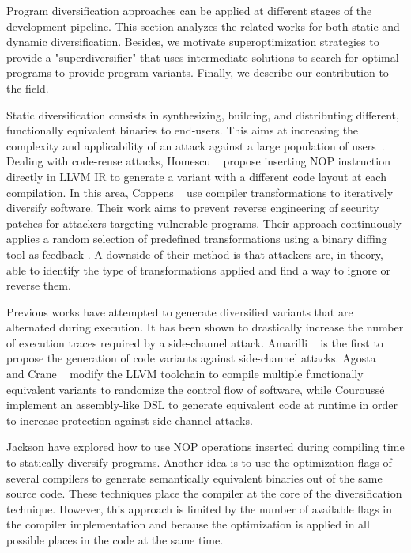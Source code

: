 Program diversification approaches can be applied at different stages of the development pipeline. This section analyzes the related works for both static and dynamic diversification. Besides, we motivate superoptimization strategies to provide a "superdiversifier" that uses intermediate solutions to search for optimal programs to provide program variants. Finally, we describe our contribution to the field.


Static diversification consists in synthesizing, building, and distributing different, functionally equivalent binaries to end-users. This aims at increasing the complexity and applicability of an attack against a large population of users~\cite{cohen1993operating}. 
Dealing with code-reuse attacks, Homescu \etal~\cite{homescu2013profile} propose inserting NOP instruction directly in LLVM IR to generate a variant with a different code layout at each compilation. 
In this area, Coppens \etal~\cite{coppens2013feedback} use compiler transformations to iteratively diversify software.
Their work aims to prevent reverse engineering of security patches for attackers targeting vulnerable programs.
Their approach continuously applies a random selection of predefined transformations using a binary diffing tool as feedback \citationneeded.
A downside of their method is that attackers are, in theory, able to identify the type of transformations applied and find a way to ignore or reverse them.

Previous works have attempted to generate diversified variants that are alternated during execution.
It has been shown to drastically increase the number of execution traces required by a side-channel attack.
Amarilli \etal~\cite{amarilli2011can} is the first to propose the generation of code variants against side-channel attacks.
Agosta \etal~\cite{agosta2015meet} and Crane \etal~\cite{crane2015thwarting}
modify the LLVM toolchain to compile multiple functionally equivalent variants to randomize the control flow of software,
while Courouss{\'e} \etal~\cite{courousse2016runtime} implement an assembly-like DSL to generate equivalent code at runtime in order to increase protection against side-channel attacks. 


Jackson \etal \cite{jackson} have explored how to use NOP operations inserted during compiling time to statically diversify programs. Another idea  is to use the optimization flags of several compilers to generate semantically equivalent binaries out of the same source code. These techniques place the compiler at the core of the diversification technique. However, this approach is limited by the number of available flags in the compiler implementation and because the optimization is applied in all possible places in the code at the same time.


